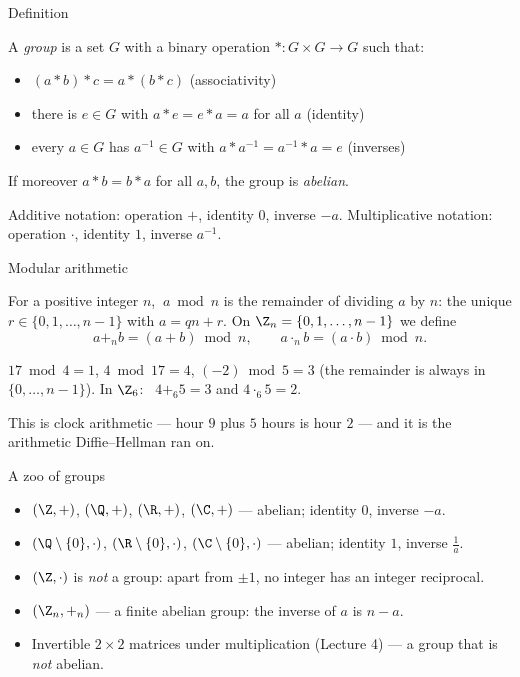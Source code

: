 \begin{frame}{Definition}
\begin{definition}
A \emph{group} is a set $G$ with a binary operation $*\colon G\times G\to G$
such that:
\begin{itemize}
\item $(a*b)*c = a*(b*c)$ \hfill (associativity)
\item there is $e\in G$ with $a*e = e*a = a$ for all $a$ \hfill (identity)
\item every $a\in G$ has $a^{-1}\in G$ with $a*a^{-1} = a^{-1}*a = e$ \hfill (inverses)
\end{itemize}
If moreover $a*b = b*a$ for all $a,b$, the group is \emph{abelian}.
\end{definition}

\pause

\begin{remark}
Additive notation: operation $+$, identity $0$, inverse $-a$.
Multiplicative notation: operation $\cdot$, identity $1$, inverse $a^{-1}$.
\end{remark}
\end{frame}

\begin{frame}{Modular arithmetic}
\begin{definition}
For a positive integer $n$, $\ a \bmod n$ is the remainder of dividing $a$
by $n$: the unique $r \in \{0, 1, \ldots, n-1\}$ with $a = qn + r$.
On $\Z_n = \{0, 1, \ldots, n-1\}$ we define
\[
a +_n b = (a+b) \bmod n, \qquad a \cdot_n b = (a \cdot b) \bmod n.
\]
\end{definition}

\pause

\begin{example}
$17 \bmod 4 = 1$, \quad $4 \bmod 17 = 4$, \quad $(-2) \bmod 5 = 3$
(the remainder is always in $\{0,\ldots,n-1\}$).
In $\Z_6$: \ $4 +_6 5 = 3$ and $4 \cdot_6 5 = 2$.
\end{example}

\pause

This is clock arithmetic — hour $9$ plus $5$ hours is hour $2$ — and it is
the arithmetic Diffie--Hellman ran on.
\end{frame}

\begin{frame}{A zoo of groups}
\begin{itemize}
\item $(\Z, +)$, $(\Q, +)$, $(\R, +)$, $(\C, +)$ — abelian; identity $0$,
inverse $-a$.
\pause
\item $(\Q\setminus\{0\}, \cdot)$, $(\R\setminus\{0\}, \cdot)$,
$(\C\setminus\{0\}, \cdot)$ — abelian; identity $1$, inverse $\tfrac1a$.
\pause
\item $(\Z, \cdot)$ is \emph{not} a group: apart from $\pm 1$, no integer has
an integer reciprocal.
\pause
\item $(\Z_n, +_n)$ — a finite abelian group: the inverse of $a$ is $n - a$.
\pause
\item Invertible $2\times 2$ matrices under multiplication (Lecture 4) — a
group that is \emph{not} abelian.
\end{itemize}
\end{frame}

